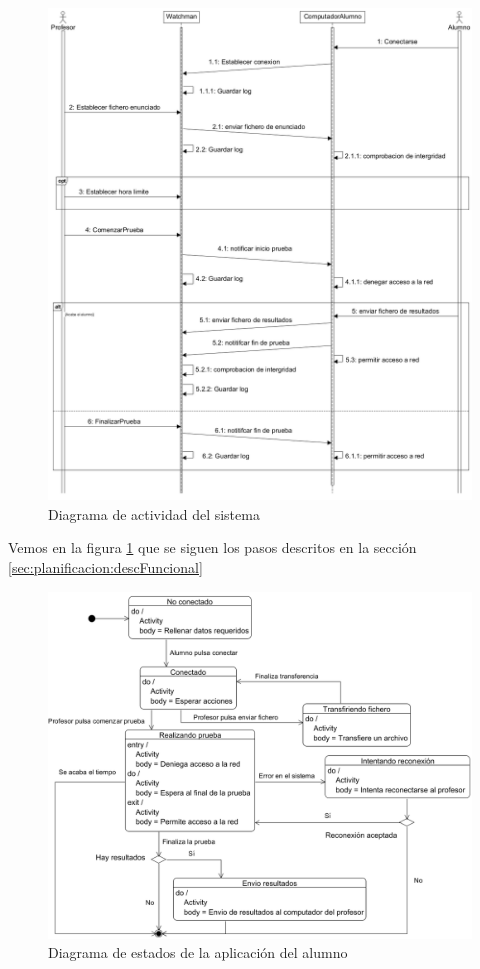 \begin{figure}
    \centering
    \includegraphics[width=\linewidth]{arquitectura/actividadSistema3}
    \caption{Diagrama de actividad del sistema}
    \label{fig:arquitectura:actividadSistema}
\end{figure}


Vemos en la figura \ref{fig:arquitectura:actividadSistema} que se siguen los pasos descritos en la sección \ref{sec:planificacion:descFuncional}



\begin{figure}
    \centering
    \includegraphics[width=\linewidth]{arquitectura/estadosAlumno2}
    \caption{Diagrama de estados de la aplicación del alumno}
    \label{fig:arquitectura:estadosAlumno}
\end{figure}


